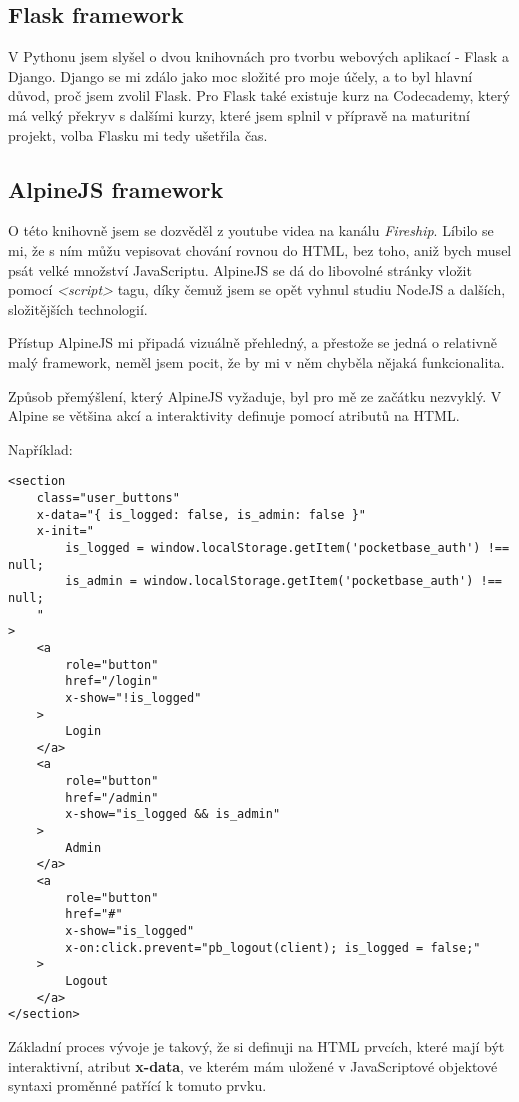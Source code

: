 \documentclass[11pt,a4paper,twoside,openright]{report}
\begin{document}
\subsection{Flask framework}
V Pythonu jsem slyšel o dvou knihovnách pro tvorbu webových aplikací - Flask a Django. Django se mi zdálo
jako moc složité pro moje účely, a to byl hlavní důvod, proč jsem zvolil Flask. Pro Flask také existuje
kurz na Codecademy, který má velký překryv s dalšími kurzy, které jsem splnil v přípravě na maturitní projekt,
volba Flasku mi tedy ušetřila čas.

\subsection{AlpineJS framework}
O této knihovně jsem se dozvěděl z youtube videa na kanálu \emph{Fireship}. Líbilo se mi, že s ním můžu
vepisovat chování rovnou do HTML, bez toho, aniž bych musel psát velké množství JavaScriptu. AlpineJS se
dá do libovolné stránky vložit pomocí \emph{<script>} tagu, díky čemuž jsem se opět vyhnul studiu NodeJS
a dalších, složitějších technologií.

Přístup AlpineJS mi připadá vizuálně přehledný, a přestože se jedná o relativně malý framework, neměl jsem
pocit, že by mi v něm chyběla nějaká funkcionalita.

Způsob přemýšlení, který AlpineJS vyžaduje, byl pro mě ze začátku nezvyklý. V Alpine se většina akcí a interaktivity
definuje pomocí atributů na HTML.

Například:

\begin{verbatim}
<section
	class="user_buttons"
	x-data="{ is_logged: false, is_admin: false }"
	x-init="
		is_logged = window.localStorage.getItem('pocketbase_auth') !== null;
		is_admin = window.localStorage.getItem('pocketbase_auth') !== null;
	"
>
    <a
    	role="button"
    	href="/login"
    	x-show="!is_logged"
    >
    	Login
    </a>
    <a
    	role="button"
    	href="/admin"
    	x-show="is_logged && is_admin"
    >
        Admin
    </a>
    <a
        role="button"
        href="#"
        x-show="is_logged"
        x-on:click.prevent="pb_logout(client); is_logged = false;"
    >
    	Logout
    </a>
</section>
\end{verbatim}

Základní proces vývoje je takový, že si definuji na HTML prvcích, které mají být interaktivní,
atribut \textbf{x-data}, ve kterém mám uložené v JavaScriptové objektové syntaxi proměnné patřící
k tomuto prvku.
\end{document}
